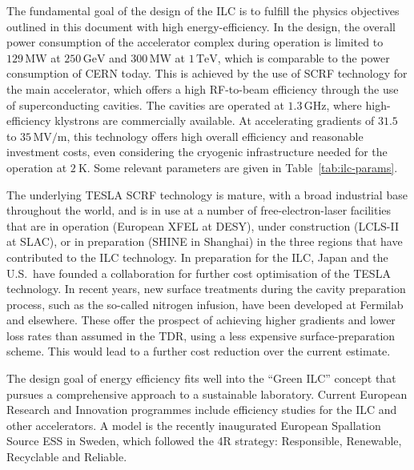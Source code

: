 \documentclass[%
 reprint,
 floatfix,
 amsmath,amssymb,
 aps,
]{revtex4-1}
\begin{document}
The fundamental goal of the design of the ILC is to fulfill the
physics objectives outlined in this document  with high energy-efficiency.  In the design,
the overall power consumption of the accelerator complex during operation is limited to $129\,{\mathrm{MW}}$ at  $250\,{\mathrm{GeV}}$ and $300\,{\mathrm{MW}}$ at  $1\,{\mathrm{TeV}}$, which is comparable to the power consumption of CERN today.
This is achieved by the use of SCRF technology for the main
accelerator, which offers a high RF-to-beam efficiency through the use
of superconducting cavities.  The cavities are operated at 
 $1.3\,{\mathrm{GHz}}$, where high-efficiency klystrons are commercially available.
At accelerating gradients of $31.5$ to $35\,{\mathrm{MV/m}}$, this
technology offers high overall efficiency and reasonable investment
costs, even considering the cryogenic infrastructure needed for the
operation 
at $2~\mathrm{K}$. Some relevant parameters are given in Table~\ref{tab:ilc-params}.

The underlying TESLA SCRF technology is mature, with a broad industrial
base throughout the world, and is in use at a number of free-electron-laser
facilities that are in operation (European XFEL at DESY), under construction (LCLS-II at SLAC),
 or in preparation (SHINE in Shanghai) in the three regions that have
 contributed to the ILC technology. In preparation for the ILC, Japan and
 the U.S.\ 
have founded a collaboration for further cost optimisation of the TESLA technology.
In recent years, new surface treatments during the cavity preparation
process, such as the so-called nitrogen infusion, have been 
developed at Fermilab and elsewhere.
These offer the prospect of  achieving  higher gradients and lower loss
rates than
assumed in the TDR, using a less expensive surface-preparation scheme.
This  would lead to a
 further cost reduction over
the current
 estimate.
 
 The design goal of energy efficiency fits well into the ``Green ILC'' concept \cite{GreenILC} that pursues a comprehensive approach to a sustainable laboratory.  Current European Research and Innovation programmes include
 efficiency studies for the ILC and other accelerators. 
A model is the recently inaugurated European Spallation Source ESS in Sweden, which followed the 4R strategy: Responsible, Renewable, Recyclable and Reliable.
\end{document}

